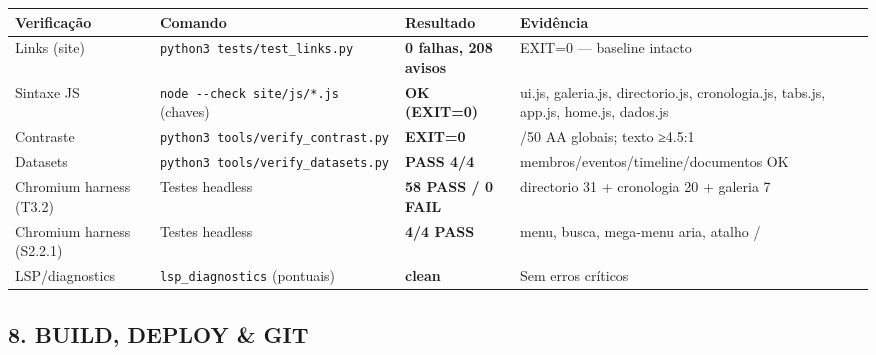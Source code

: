 {\def\LTcaptype{none} %
\begin{longtable}[]{@{}
  >{\raggedright\arraybackslash}p{}
  >{\raggedright\arraybackslash}p{}
  >{\raggedright\arraybackslash}p{}
  >{\raggedright\arraybackslash}p{}@{}}
\toprule\noalign{}
\begin{minipage}[b]{\linewidth}\raggedright
Verificação
\end{minipage} & \begin{minipage}[b]{\linewidth}\raggedright
Comando
\end{minipage} & \begin{minipage}[b]{\linewidth}\raggedright
Resultado
\end{minipage} & \begin{minipage}[b]{\linewidth}\raggedright
Evidência
\end{minipage} \\
\midrule\noalign{}
\endhead
\bottomrule\noalign{}
\endlastfoot
Links (site) & \texttt{python3\ tests/test\_links.py} & \textbf{0
falhas, 208 avisos} & EXIT=0 --- baseline intacto \\
Sintaxe JS & \texttt{node\ -\/-check\ site/js/*.js} (chaves) &
\textbf{OK (EXIT=0)} & ui.js, galeria.js, directorio.js, cronologia.js,
tabs.js, app.js, home.js, dados.js \\
Contraste & \texttt{python3\ tools/verify\_contrast.py} &
\textbf{EXIT=0} & 48/50 AA globais; texto ≥4.5:1 \\
Datasets & \texttt{python3\ tools/verify\_datasets.py} & \textbf{PASS
4/4} & membros/eventos/timeline/documentos OK \\
Chromium harness (T3.2) & Testes headless & \textbf{58 PASS / 0 FAIL} &
directorio 31 + cronologia 20 + galeria 7 \\
Chromium harness (S2.2.1) & Testes headless & \textbf{4/4 PASS} & menu,
busca, mega-menu aria, atalho / \\
LSP/diagnostics & \texttt{lsp\_diagnostics} (pontuais) & \textbf{clean}
& Sem erros críticos \\
\end{longtable}
}

\subsection{8. BUILD, DEPLOY \& GIT}\label{build-deploy-git}

